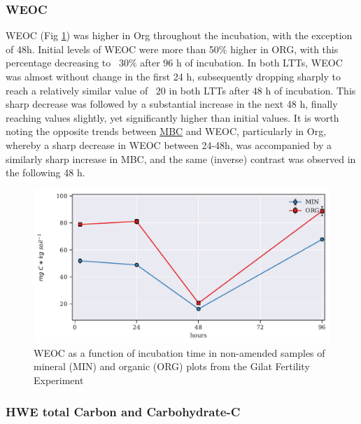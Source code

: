         \subsubsection{WEOC}
            WEOC  (Fig \ref{fig:weoc_control_preliminary}) was higher in Org throughout the incubation, with the exception of 48h. Initial levels of WEOC were more than 50$\%$ higher in ORG, with this percentage decreasing to ~30$\%$ after 96 h of incubation. In both LTTs, WEOC was almost without change in the first 24 h, subsequently dropping sharply to reach a relatively similar value of ~20 \genericunit in both LTTs after 48 h of incubation. This sharp decrease was followed by a substantial increase in the next 48 h, finally reaching values  slightly, yet significantly higher than initial values. It is worth noting the opposite trends between \hyperref[fig:mbc_control_main]{MBC} and WEOC, particularly in  Org, whereby  a sharp decrease in WEOC between 24-48h, was accompanied by a similarly sharp increase in MBC, and the same (inverse) contrast was observed in the following 48 h.

            \begin{figure}[H]
            \centering
            \includegraphics[scale=0.8]{thesis_figures/preliminary/control/WEOC.pdf}
            \caption{WEOC  as a function of incubation time in non-amended samples  of mineral (MIN) and organic (ORG) plots from the Gilat Fertility Experiment}
            \label{fig:weoc_control_preliminary}
             \end{figure}


       	\subsubsection{HWE total Carbon and Carbohydrate-C}


